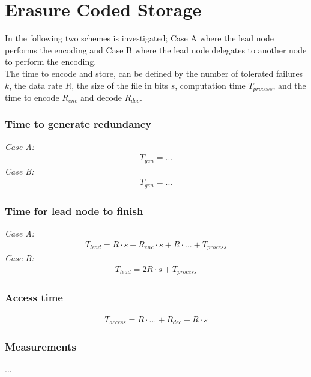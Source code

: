 \section{Erasure Coded Storage}
In the following two schemes is investigated; Case A where the lead node performs the encoding and Case B where the lead node delegates to another node to perform the encoding.\\
The time to encode and store, can be defined by the number of tolerated failures $k$, the data rate $R$, the size of the file in bits $s$, computation time $T_{process}$, and the time to encode $R_{enc}$ and decode $R_{dec}$.

\subsubsection*{Time to generate redundancy}
\textit{Case A:} 
\begin{align}
    T_{gen} = ...
\end{align}
\textit{Case B:} 
\begin{align}
    T_{gen} = ...
\end{align}

\subsubsection*{Time for lead node to finish}
\textit{Case A:} 
\begin{align}
    T_{lead} = R \cdot s + R_{enc} \cdot s + R \cdot ... + T_{process}
\end{align}
\textit{Case B:} 
\begin{align}
    T_{lead} = 2R \cdot s + T_{process}
\end{align}

\subsubsection*{Access time}
\begin{align}
    T_{access} = R \cdot ... + R_{dec} + R \cdot s
\end{align}

\subsubsection*{Measurements}
...
